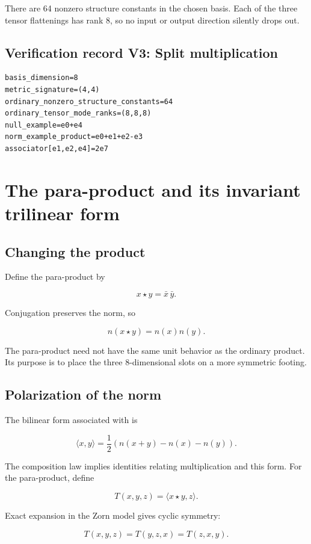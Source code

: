 \documentclass[11pt]{article}
\begin{document}
There are 64 nonzero structure constants in the chosen basis. Each of the three tensor flattenings has rank 8, so no input or output direction silently drops out.

\subsection{Verification record V3: Split multiplication}

\begin{Verbatim}[fontsize=\small]
basis_dimension=8
metric_signature=(4,4)
ordinary_nonzero_structure_constants=64
ordinary_tensor_mode_ranks=(8,8,8)
null_example=e0+e4
norm_example_product=e0+e1+e2-e3
associator[e1,e2,e4]=2e7
\end{Verbatim}

\section{The para-product and its invariant trilinear form}

\subsection{Changing the product}

Define the para-product by

\[
x\star y=\bar x\,\bar y.
\]

Conjugation preserves the norm, so

\[
n(x\star y)=n(x)n(y).
\]

The para-product need not have the same unit behavior as the ordinary product. Its purpose is to place the three 8-dimensional slots on a more symmetric footing.

\subsection{Polarization of the norm}

The bilinear form associated with \texttt{} is

\[
\langle x,y\rangle
=\frac12\left(n(x+y)-n(x)-n(y)\right).
\]

The composition law implies identities relating multiplication and this form. For the para-product, define

\[
T(x,y,z)=\langle x\star y,z\rangle.
\]

Exact expansion in the Zorn model gives cyclic symmetry:

\[
T(x,y,z)=T(y,z,x)=T(z,x,y).
\]
\end{document}
